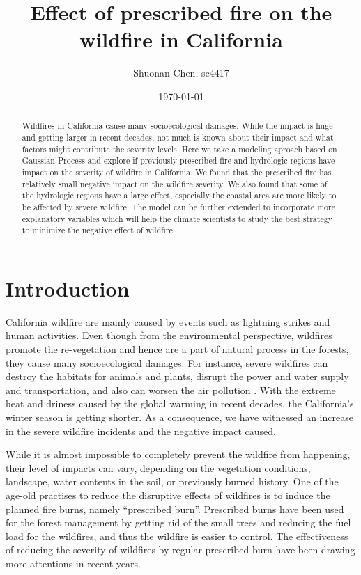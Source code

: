 \documentclass{article}
\begin{document}
\title{Effect of prescribed fire on the wildfire in California}
\date{\today}
\author{Shuonan Chen, sc4417}

\maketitle

\begin{abstract}
Wildfires in California cause many socioecological damages. While the impact is huge and getting larger in recent decades, not much is known about their impact and what factors might contribute the severity levels. 
Here we take a modeling aproach based on Gaussian Process and explore if previously prescribed fire and hydrologic regions have impact on the severity of wildfire in California. We found that the prescribed fire has relatively small negative impact on the wildfire severity. We also found that some of the hydrologic regions have a large effect, especially the coastal area are more likely to be affected by severe wildfire. The model can be further extended to incorporate more explanatory variables which will help the climate scientists to study the best strategy to minimize the negative effect of wildfire. 
\end{abstract}



\section{Introduction}
California wildfire are mainly caused by events such as lightning strikes and human activities. Even though from the environmental perspective, wildfires promote the re-vegetation and hence are a part of natural process in the forests, they cause many socioecological damages. For instance, severe wildfires can destroy the habitats for animals and plants, disrupt the power and water supply and transportation, and also can worsen the air pollution \cite{moritz2014learning}. 
With the extreme heat and driness caused by the global warming in recent decades, the California's winter season is getting shorter. As a consequence, we have witnessed an increase in the severe wildfire incidents and the negative impact caused. 


While it is almost impossible to completely prevent the wildfire from happening, their level of impacts can vary, depending on the vegetation conditions, landscape, water contents in the soil, or previously burned history. One of the age-old practises to reduce the disruptive effects of wildfires is to induce the planned fire burns, namely ``prescribed burn''. Prescribed burns have been used for the forest management by getting rid of the small trees and reducing the fuel load for the wildfires, and thus the wildfire is easier to control. The effectiveness of reducing the severity of wildfires by regular prescribed burn have been drawing more attentions in recent years. 
\end{document}
